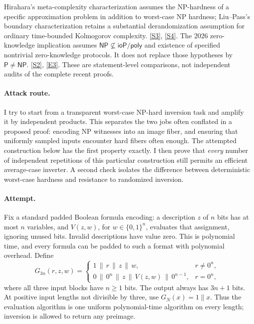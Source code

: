 \documentclass[11pt,a4paper]{article}
\newcommand{\sref}[2]{\hyperlink{source:#1:#2}{[S#2]}}
\newcommand{\eref}[2]{\hyperlink{extra:#1:#2}{[E#2]}}
\numberwithin{equation}{section}
\begin{document}
Hirahara's meta-complexity characterization assumes the NP-hardness of a
specific approximation problem in addition to worst-case NP hardness;
Liu--Pass's boundary characterization retains a substantial derandomization
assumption for ordinary time-bounded Kolmogorov complexity.
\sref{statement}{3}, \sref{statement}{4}. The 2026 zero-knowledge implication assumes
$\mathsf{NP}\not\subseteq\mathsf{ioP/poly}$ and existence of specified
nontrivial zero-knowledge protocols. It does not replace those hypotheses
by $\mathsf P\ne\mathsf{NP}$. \sref{statement}{2}, \eref{statement}{3}.
These are statement-level comparisons, not independent audits of the
complete recent proofs.

\paragraph{Attack route.}
I try to start from a transparent worst-case NP-hard inversion task and
amplify it by independent products. This separates the two jobs often
conflated in a proposed proof: encoding NP witnesses into an image fiber,
and ensuring that uniformly sampled inputs encounter hard fibers often
enough. The attempted construction below has the first property exactly.
I then prove that \emph{every} number of independent repetitions of this
particular construction still permits an efficient average-case inverter.
A second check isolates the difference between deterministic worst-case
hardness and resistance to randomized inversion.

\paragraph{Attempt.}
Fix a standard padded Boolean formula encoding: a description $z$ of $n$
bits has at most $n$ variables, and $V(z,w)$, for $w\in\{0,1\}^n$, evaluates
that assignment, ignoring unused bits. Invalid descriptions have value zero.
This is polynomial time, and every formula can be padded to such a format
with polynomial overhead. Define
\begin{equation}\label{r33:rare}
 G_{3n}(r,z,w)=
 \begin{cases}
  1\,\|\,r\,\|\,z\,\|\,w,&r\ne0^n,\\
  0\,\|\,0^n\,\|\,z\,\|\,V(z,w)\,\|\,0^{n-1},&r=0^n,
 \end{cases}
\end{equation}
where all three input blocks have $n\ge1$ bits. The output always has
$3n+1$ bits. At positive input lengths not divisible by three, use
$G_N(x)=1\|x$. Thus the evaluation algorithm is one uniform polynomial-time
algorithm on every length; inversion is allowed to return any preimage.
\end{document}
